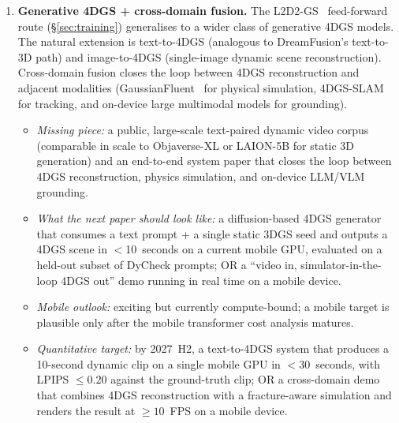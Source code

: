 \begin{enumerate}
  \item \textbf{Generative 4DGS + cross-domain fusion.} The
        L2D2-GS~\cite{song2026l2d2gs} feed-forward route
        (\S\ref{sec:training}) generalises to a wider class of
        generative 4DGS models. The natural extension is
        text-to-4DGS (analogous to DreamFusion's text-to-3D path)
        and image-to-4DGS (single-image dynamic scene
        reconstruction). Cross-domain fusion closes the loop
        between 4DGS reconstruction and adjacent modalities
        (GaussianFluent~\cite{huang2026gaussianfluent} for
        physical simulation, 4DGS-SLAM for tracking, and
        on-device large multimodal models for grounding).
        \begin{itemize}
        \item \textit{Missing piece:} a public, large-scale
              text-paired dynamic video corpus (comparable in
              scale to Objaverse-XL or LAION-5B for static
              3D generation) and an end-to-end system paper
              that closes the loop between 4DGS reconstruction,
              physics simulation, and on-device LLM/VLM grounding.
        \item \textit{What the next paper should look like:} a
              diffusion-based 4DGS generator that consumes a
              text prompt + a single static 3DGS seed and
              outputs a 4DGS scene in $<$10~seconds on a
              current mobile GPU, evaluated on a held-out subset
              of DyCheck prompts; OR a ``video in,
              simulator-in-the-loop 4DGS out'' demo running in
              real time on a mobile device.
        \item \textit{Mobile outlook:} exciting but
              currently compute-bound; a mobile target
              is plausible only after the mobile
              transformer cost analysis matures.
        \item \textit{Quantitative target:} by 2027~H2, a
              text-to-4DGS system that produces a 10-second
              dynamic clip on a single mobile GPU in
              $<$30~seconds, with LPIPS $\le 0.20$ against the
              ground-truth clip; OR a cross-domain demo that
              combines 4DGS reconstruction with a
              fracture-aware simulation and renders the result
              at $\ge 10$~FPS on a mobile device.
        \end{itemize}


\end{enumerate}
